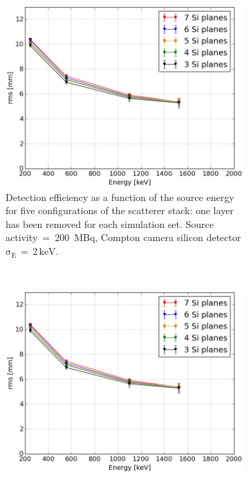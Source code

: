 \begin{figure}[h!]
\begin{subfigure}[t]{1\textwidth}
\centering
\includegraphics[scale=0.5]{03_GraphicFiles/chapter5_SPECTsimu/SPECT/compton/geometry/rmsVSenergy_NSiplanes.png}
\caption{Detection efficiency as a function of the source energy for five configurations of the scatterer stack: one layer has been removed for each simulation set. Source activity~=~200~MBq, Compton camera silicon detector $\mathrm{\sigma_{E}\,=\,2\,keV}$.}
\label{chap5::fig::design_eff}
\end{subfigure} \\ 
\begin{subfigure}[t]{.5\textwidth}
\centering
  \includegraphics[width=.95\linewidth]{03_GraphicFiles/chapter5_SPECTsimu/SPECT/compton/geometry/rmsVSenergy_NSiplanes.png}

\end{subfigure}
\end{figure}
